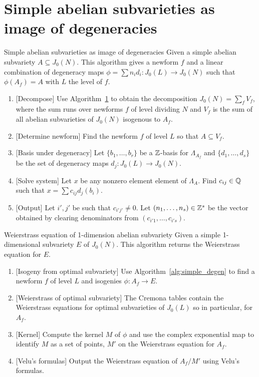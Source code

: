 \documentclass[11pt, proquest]{uwthesis}
\begin{document}
\section{Simple abelian subvarieties as image of degeneracies}
\begin{algorithm}{Simple abelian subvarieties as image of degeneracies}%
    \label{alg:simple_degen}
    Given a simple abelian subvariety $A\subseteq J_0(N)$. This algorithm
    gives a newform $f$ and a linear combination of degeneracy maps
    $\phi=\sum n_i d_i:J_0(L)\to J_0(N)$ such that $\phi(A_f)=A$ with $L$ the
    level of $f$.
    \begin{enumerate}
        \item{} [Decompose]
            Use Algorithm~\ref{} to obtain the decomposition $J_0(N)=\sum_f
            V_f$, where the sum runs over newforms $f$ of level dividing $N$
            and $V_f$ is the sum of all abelian subvarieties of $J_0(N)$
            isogenous to $A_f$.
        \item{} [Determine newform]
            Find the newform $f$ of level $L$ so that $A\subseteq V_f$. 
        \item{} [Basis under degeneracy]
            Let $\{b_1,\ldots,b_r\}$ be a $\mathbb{Z}$-basis for $\Lambda_{A_f}$ and
            $\{d_1,\ldots,d_s\}$ be the set of degeneracy maps $d_j:J_0(L)\to
            J_0(N)$. 
        \item{} [Solve system]
            Let $x$ be any nonzero element element of $\Lambda_A$. Find
            $c_{ij}\in \mathbb{Q}$ such that $x=\sum c_{ij} d_j(b_i)$.
        \item{} [Output]
            Let $i', j'$ be such that $c_{i'j'}\neq 0$. Let
            $(n_1,\ldots,n_s)\in \mathbb{Z}^s$ be the vector obtained by 
            clearing denominators from $(c_{i'1},\ldots,c_{i's})$.
    \end{enumerate}
\end{algorithm}


\begin{algorithm}{Weierstrass equation of 1-dimension abelian subvariety}%
    \label{alg:weierstrass}
    Given a simple 1-dimensional subvariety $E$ of $J_0(N)$. This algorithm
    returns the Weierstrass equation for $E$.
    \begin{enumerate}
        \item{}
            [Isogeny from optimal subvariety] Use
            Algorithm~\ref{alg:simple_degen} to find a newform $f$ of level
            $L$ and isogenies $\phi:A_f\to E$.
        \item{}
            [Weierstrass of optimal subvariety] The Cremona tables contain the
            Weierstrass equations for optimal subvarieties of $J_0(L)$ so in
            particular, for $A_f$.
        \item{}
            [Kernel] Compute the kernel $M$ of $\phi$ and use the complex
            exponential map to identify $M$ as a set of points, $M'$ on the
            Weierstrass equation for $A_f$.
        \item{}
            [Velu's formulas] Output the Weierstrass equation of $A_f/M'$ using
            Velu's formulas.
    \end{enumerate}
\end{algorithm}
\end{document}
